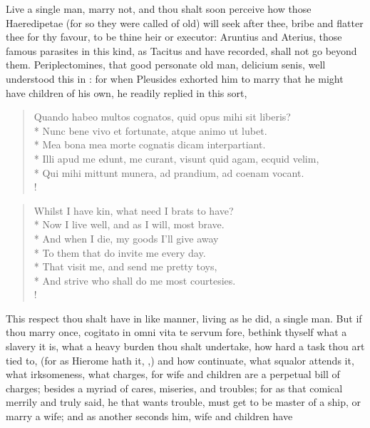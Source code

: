 Live a single man, marry not, and thou shalt soon perceive how those
Haeredipetae (for so they were called of old) will seek after thee,
bribe and flatter thee for thy favour, to be thine heir or executor:
Aruntius and Aterius, those famous parasites in this kind, as Tacitus
and \Seneca{} have recorded, shall not go beyond them.
Periplectomines, that good personate old man, delicium senis, well
understood this in \Plautus{}: for when Pleusides exhorted him to marry
that he might have children of his own, he readily replied in this
sort,
%
\begin{latin}%
\begin{verse}%
Quando habeo multos cognatos, quid opus mihi sit liberis?\\*
Nunc bene vivo et fortunate, atque animo ut lubet.\\*
Mea bona mea morte cognatis dicam interpartiant.\\*
Illi apud me edunt, me curant, visunt quid agam, ecquid velim,\\*
Qui mihi mittunt munera, ad prandium, ad coenam vocant.\\!
\end{verse}%
\end{latin}%
\translationrule%
\begin{verse}%
Whilst I have kin, what need I brats to have?\\*
Now I live well, and as I will, most brave.\\*
And when I die, my goods I'll give away\\*
To them that do invite me every day.\\*
That visit me, and send me pretty toys,\\*
And strive who shall do me most courtesies.\\!
\end{verse}%
%
This respect thou shalt have in like manner, living as he did, a single
man. But if thou marry once, cogitato in omni vita te servum
fore, bethink thyself what a slavery it is, what a heavy burden thou
shalt undertake, how hard a task thou art tied to, (for as Hierome hath
it, ,) and how
continuate, what squalor attends it, what irksomeness, what charges,
for wife and children are a perpetual bill of charges; besides a myriad
of cares, miseries, and troubles; for as that comical \Plautus{} merrily
and truly said, he that wants trouble, must get to be master of a ship,
or marry a wife; and as another seconds him, wife and children have
